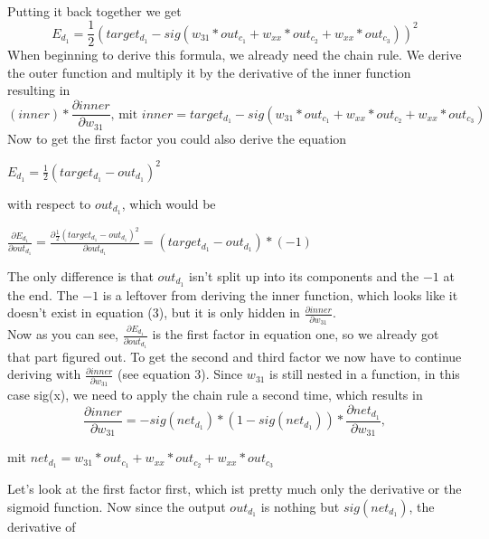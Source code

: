 \documentclass[11pt, halfparskip]{article}
\begin{document}
\noindent\\
Putting it back together we get
    \begin{equation}
    	E_{d_1} = \frac{1}{2}(target_{d_1} - sig(w_{31}*out_{c_1} + w_{xx}*out_{c_2} + w_{xx}*out_{c_3}))^2
    \end{equation}
When beginning to derive this formula, we already need the chain rule. We derive the outer function and multiply it by the derivative of the inner function resulting in
    \begin{equation}%
    	(inner)*\frac{\partial inner}{\partial w_{31}} \textrm{, mit } inner = target_{d_1} - sig(w_{31}*out_{c_1} + w_{xx}*out_{c_2} + w_{xx}*out_{c_3})
    \end{equation}
Now to get the first factor you could also derive the equation
   \begin{center}
$E_{d_1} = \frac{1}{2}(target_{d_1} - out_{d_1})^2$
   \end{center}
with respect to $out_{d_1}$, which would be
    \begin{center}
	$\frac{\partial E_{d_1}}{\partial out_{d_1}} = \frac{\partial \frac{1}{2}(target_{d_1}-out_{d_1})^2}{\partial out_{d_1}} = (target_{d_1}-out_{d_1})*(-1)$
    \end{center}
The only difference is that $out_{d_1}$ isn't split up into its components and the $-1$ at the end. The $-1$ is a leftover from deriving the inner function, which looks like it
doesn't exist in equation (3), but it is only hidden in $\frac{\partial inner}{\partial w_{31}}$.\\
Now as you can see, $\frac{\partial E_{d_1}}{\partial out_{d_1}}$ is the first factor in equation one, so we already got that part figured out. To get the second and third factor we now
have to continue deriving with $\frac{\partial inner}{\partial w_{31}}$ (see equation 3). Since $w_{31}$ is still nested in a function, in this case sig(x), we need to apply the chain
rule a second time, which results in
    \begin{equation}
    	\frac{\partial inner }{\partial w_{31}} = -sig(net_{d_1})*(1 - sig(net_{d_1}))*\frac{\partial net_{d_1}}{\partial w_{31}},
    \end{equation}
    \begin{center}
    	mit $net_{d_1}=w_{31}*out_{c_1} + w_{xx}*out_{c_2} + w_{xx}*out_{c_3}$
    \end{center}
Let's look at the first factor first, which ist pretty much only the derivative or the sigmoid function. Now since the output $out_{d_1}$ is nothing but $sig(net_{d_1})$, the derivative of
\end{document}
